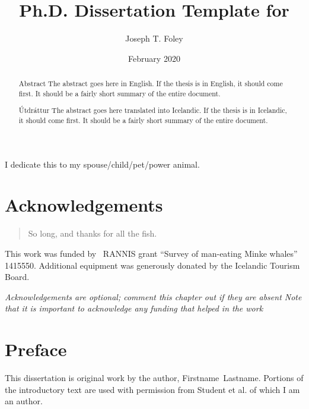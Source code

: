 \documentclass[12pt,a4paper,titlepage]{memoir}
\title{Ph.D. Dissertation Template for \theInstitution{}}
\author{Joseph T. Foley}%
\date{February 2020}%
\begin{document}
\maketitle
\copyrightpage{}
\signaturepage{}
\archivesigpage{}

\begin{abstract}{Abstract}{\thetitle}{\thedate}
  The abstract goes here in English.
  If the thesis is in English, it should come first.
  It should be a fairly short summary of the entire document.
\end{abstract}

\begin{abstract}{Útdráttur}{\thetitleIS}{\thedateIS}
  The abstract goes here translated into Icelandic.
  If the thesis is in Icelandic, it should come first.
  It should be a fairly short summary of the entire document.
\end{abstract}

\begin{dedications}
  I dedicate this to my spouse/child/pet/power animal.
\end{dedications}

\enableindents{}%

\chapter*{Acknowledgements} 
\begin{quotation}
So long, and thanks for all the fish.
\end{quotation}
\vspace{\baselineskip}

This work was funded by \the\year~RANNIS grant ``Survey of man-eating Minke whales'' 1415550.
Additional equipment was generously donated by the Icelandic Tourism Board.

{\em Acknowledgements are optional; comment this chapter out if they are absent
  Note that it is important to acknowledge any funding that helped in the work}



\chapter*{Preface}
This dissertation is original work by the author, Firstname~Lastname.
Portions of the introductory text are used with permission from
Student et al.\cite{student2015awesome} of which I am an author.
\end{document}
